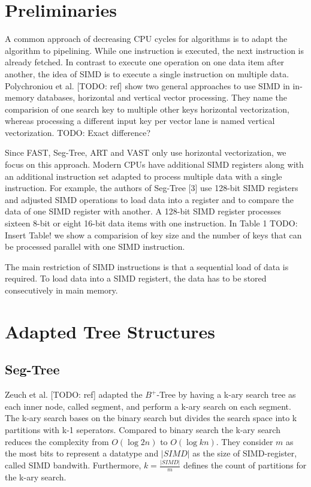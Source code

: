 \documentclass[conference]{IEEEtran}
\begin{document}
\section{Preliminaries}
A common approach of decreasing CPU cycles for algorithms is to adapt the algorithm to pipelining. While one instruction is executed, the next instruction is already fetched. In contrast to execute one operation on one data item after another, the idea of SIMD is to execute a single instruction on multiple data. Polychroniou et al. [TODO: ref] show two general approaches to use SIMD in in-memory databases, horizontal and vertical vector processing. They name the comparision of one search key to multiple other keys horizontal vectorization, whereas processing a different input key per vector lane is named vertical vectorization. TODO: Exact difference?

Since FAST, Seg-Tree, ART and VAST only use horizontal vectorization, we focus on this approach. Modern CPUs have additional SIMD registers along with an additional instruction set adapted to process multiple data with a single instruction. For example, the authors of Seg-Tree [3] use 128-bit SIMD registers and adjusted SIMD operations to load data into a register and to compare the data of one SIMD register with another. A 128-bit SIMD register processes sixteen 8-bit or eight 16-bit data items with one instruction. In Table 1 TODO: Insert Table! we show a comparision of key size and the number of keys that can be processed parallel with one SIMD instruction.

The main restriction of SIMD instructions is that a sequential load of data is required. To load data into a SIMD registert, the data has to be stored consecutively in main memory.
\section{Adapted Tree Structures}
\subsection{Seg-Tree}\label{SCM}
Zeuch et al. [TODO: ref] adapted the $B^+$-Tree by having a k-ary search tree as each inner node, called segment, and perform a k-ary search on each segment. The k-ary search bases on the binary search but divides the search space into k partitions with k-1 seperators. Compared to binary search the k-ary search reduces the complexity from $O(\log{2}{n})$ to $O(\log{k}{n})$. They consider $m$ as the most bits to represent a datatype and $\vert SIMD \vert$ as the size of SIMD-register, called SIMD bandwith. Furthermore, $k = \frac{\vert SIMD \vert }{m}$ defines the count of partitions for the k-ary search. 
\end{document}

